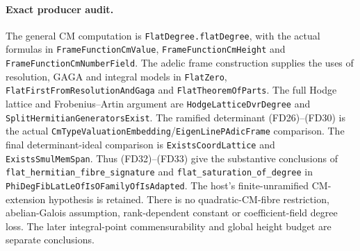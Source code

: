 \paragraph{Exact producer audit.}
The general CM computation is
\texttt{FlatDegree.flatDegree}, with the actual formulas
in \texttt{FrameFunctionCmValue},
\texttt{FrameFunctionCmHeight} and
\texttt{FrameFunctionCmNumberField}.
The adelic frame construction supplies the uses of
resolution, GAGA and integral models in \texttt{FlatZero},
\texttt{FlatFirstFromResolutionAndGaga} and
\texttt{FlatTheoremOfParts}.
The full Hodge lattice and Frobenius--Artin argument are
\texttt{HodgeLatticeDvrDegree} and
\texttt{SplitHermitianGeneratorsExist}.
The ramified determinant (FD26)--(FD30) is the actual
\texttt{CmTypeValuationEmbedding}/\texttt{EigenLinePAdicFrame}
comparison.
The final determinant-ideal comparison is
\texttt{ExistsCoordLattice} and \texttt{ExistsSmulMemSpan}.
Thus (FD32)--(FD33) give the substantive conclusions of
\texttt{flat\_hermitian\_fibre\_signature} and
\texttt{flat\_saturation\_of\_degree} in
\texttt{PhiDegFibLatLeOfIsOFamilyOfIsAdapted}.
The host's finite-unramified CM-extension hypothesis is retained.
There is no quadratic-CM-fibre restriction, abelian-Galois
assumption, rank-dependent constant or coefficient-field
degree loss.  The later integral-point commensurability
and global height budget are separate conclusions.
